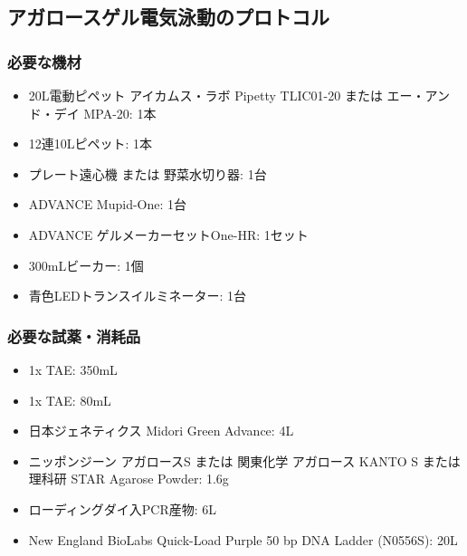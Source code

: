 \documentclass[titlepage,10pt,a4paper,uplatex]{jsbook}
\begin{document}
\subsection{アガロースゲル電気泳動のプロトコル}

\subsubsection{必要な機材}
\begin{itemize}
\item 20{\textmu}L電動ピペット アイカムス・ラボ Pipetty TLIC01-20 または エー・アンド・デイ MPA-20: 1本
\item 12連10{\textmu}Lピペット: 1本
\item プレート遠心機 または 野菜水切り器: 1台
\item ADVANCE Mupid-One: 1台
\item ADVANCE ゲルメーカーセットOne-HR: 1セット
\item 300mLビーカー: 1個
\item 青色LEDトランスイルミネーター: 1台
\end{itemize}

\subsubsection{必要な試薬・消耗品}
\begin{itemize}
\item 1x TAE: 350mL
\item 1x TAE: 80mL
\item 日本ジェネティクス Midori Green Advance: 4{\textmu}L
\item ニッポンジーン アガロースS または 関東化学 アガロース KANTO S または 理科研 STAR Agarose Powder: 1.6g
\item ローディングダイ入PCR産物: 6{\textmu}L
\item New England BioLabs Quick-Load Purple 50 bp DNA Ladder (N0556S): 20{\textmu}L
\end{itemize}
\end{document}

